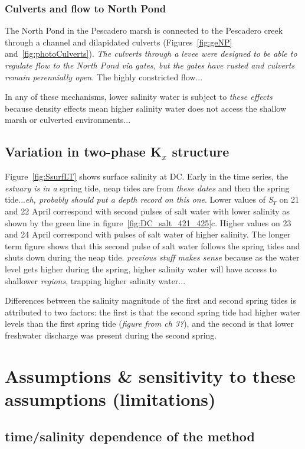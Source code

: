\subsubsection{Culverts and flow to North Pond}
The North Pond in the Pescadero marsh is connected to the Pescadero creek through a channel and dilapidated culverts (Figures~\ref{fig:geNP} and~\ref{fig:photoCulverts}). \emph{The culverts through a levee were designed to be able to regulate flow to the North Pond via gates, but the gates have rusted and culverts remain perennially open.} The highly constricted flow... 

In any of these mechanisms, lower salinity water is subject to \emph{these effects} because density effects mean higher salinity water does not access the shallow marsh or culverted environments... 

\subsection{Variation in two-phase K$_x$ structure}
Figure~\ref{fig:SsurfLT} shows surface salinity at DC. Early in the time series, the \emph{estuary is in a} spring tide, neap tides are from \emph{these dates} and then the spring tide...\emph{eh, probably should put a depth record on this one}. Lower values of \emph{S$_T$} on 21 and 22 April correspond with second pulses of salt water with lower salinity as shown by the green line in figure~\ref{fig:DC_salt_421_425}c. Higher values on 23 and 24 April correspond with pulses of salt water of higher salinity. The longer term figure shows that this second pulse of salt water follows the spring tides and shuts down during the neap tide. \emph{previous stuff makes sense} because as the water level gets higher during the spring, higher salinity water will have access to shallower \emph{regions}, trapping higher salinity water... 

Differences between the salinity magnitude of the first and second spring tides is attributed to two factors: the first is that the second spring tide had higher water levels than the first spring tide (\emph{figure from ch 3?}), and the second is that lower freshwater discharge was present during the second spring. 

\section{Assumptions \& sensitivity to these assumptions (limitations)} \label{sec:Sensitivity}
\subsection{time/salinity dependence of the method}

